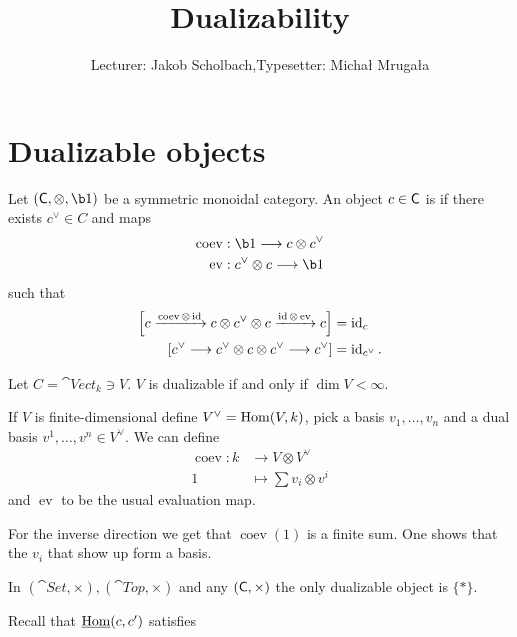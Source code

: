 
\def\coev{\operatorname{coev}}
\def\ev{\operatorname{ev}}
\def\PrL{\cat{Pr}^L}

\title{Dualizability}
\author{Lecturer: Jakob Scholbach,\quad Typesetter: Micha{\l} Mruga{\l}a}


\maketitle

\section{Dualizable objects}
\begin{definition}
	Let $(\C, \otimes, \b1)$ be a symmetric monoidal category. An object $c\in \mathsf{C}$ is
	 if there exists $c^{\vee}\in C$ and maps
	\begin{align*}
		\coev &: \b1 \to c\otimes c^{\vee} \\
		\ev &: c^{\vee}\otimes c \to \b1
	\end{align*}
	such that
	\begin{align*}
		\left[ c \xrightarrow{\coev \otimes \id} c \otimes c^{\vee}\otimes c
		\xrightarrow{\id\otimes \ev} c \right] &= \id_{c} \\
		\left[ c^{\vee}\to c^{\vee}\otimes c\otimes c^{\vee}\to c^{\vee} \right] &= \id_{c^{\vee}}
		.
	\end{align*}
\end{definition}
\begin{example}
	Let $C=\cat{Vect}_k\ni V$. $V$ is dualizable if and only if $\dim V<\infty$.

	If $V$ is finite-dimensional define $V^{\vee} = \operatorname{Hom}(V,k)$, pick a basis $v_1,\dots,v_n$
	and a dual basis $v^{1},\dots,v^{n}\in V^{\vee}$. We can define
	\begin{align*}
		\coev: k &\longrightarrow V\otimes V^{\vee} \\
		1 &\longmapsto \sum v_i\otimes v^{i}
	\end{align*}
	and $\ev$ to be the usual evaluation map.

	For the inverse direction we get that $\coev(1)$ is a finite sum. One shows that the
	$v_i$ that show up form a basis.
\end{example}
\begin{example}
	In $(\cat{Set},\times ), (\cat{Top}, \times )$ and any $(\mathsf{C},\times )$ the only
	dualizable object is $\{*\} $.
\end{example}
Recall that $\underline{\operatorname{Hom}}(c,c')$ satisfies
